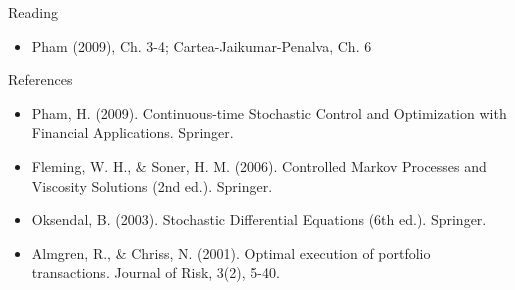 \documentclass[aspectratio=169,10pt]{beamer}
\begin{document}
\begin{frame}{Reading}
\begin{itemize}
  \item Pham (2009), Ch. 3-4; Cartea-Jaikumar-Penalva, Ch. 6
\end{itemize}
\end{frame}

\begin{frame}{References}
\scriptsize\begin{itemize}\setlength{\itemsep}{3pt}
  \item Pham, H. (2009). Continuous-time Stochastic Control and Optimization with Financial Applications. Springer.
  \item Fleming, W. H., \& Soner, H. M. (2006). Controlled Markov Processes and Viscosity Solutions (2nd ed.). Springer.
  \item Oksendal, B. (2003). Stochastic Differential Equations (6th ed.). Springer.
  \item Almgren, R., \& Chriss, N. (2001). Optimal execution of portfolio transactions. Journal of Risk, 3(2), 5-40.
\end{itemize}
\end{frame}
\end{document}
